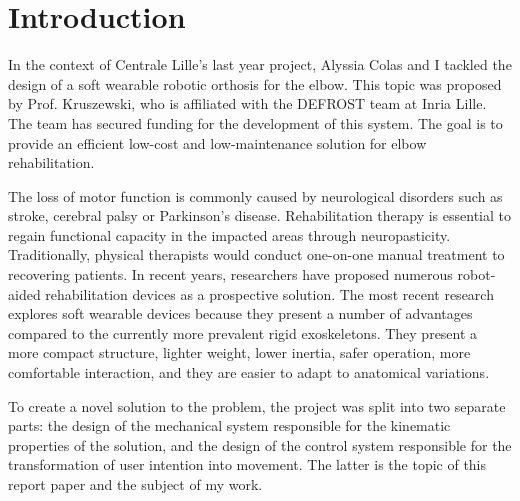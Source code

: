 \chapter{Introduction}

In the context of Centrale Lille's last year project, Alyssia Colas and I tackled 
the design of a soft wearable robotic orthosis for the elbow. This topic was proposed 
by Prof. Kruszewski, who is affiliated with the DEFROST team at Inria Lille. The team 
has secured funding for the development of this system. The goal is to 
provide an efficient low-cost and low-maintenance solution for elbow rehabilitation.  

\bigskip

The loss of motor function is commonly caused by neurological disorders such as 
stroke, cerebral palsy or Parkinson's disease. Rehabilitation therapy is essential 
to regain functional capacity in the impacted areas through neuropasticity. 
Traditionally, physical therapists would conduct one-on-one manual treatment 
to recovering patients. In recent years, researchers have proposed numerous 
robot-aided rehabilitation devices as a prospective solution. The most recent research 
explores soft wearable devices because they present a number of advantages 
compared to the currently more prevalent rigid exoskeletons. They present a more 
compact structure, lighter weight, lower inertia, safer operation, more comfortable 
interaction, and they are easier to adapt to anatomical variations.  

\bigskip

To create a novel solution to the problem, the project was split into two separate 
parts: the design of the mechanical system responsible for the kinematic properties 
of the solution, and the design of the control system responsible for the transformation 
of user intention into movement. The latter is the topic of this report paper and the 
subject of my work.  
